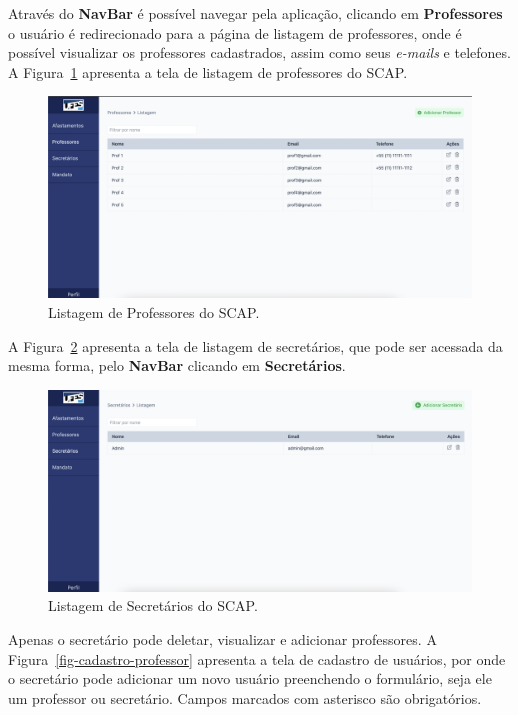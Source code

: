 Através do \textbf{NavBar} é possível navegar pela aplicação, clicando em \textbf{Professores} o usuário é redirecionado
para a página de listagem de professores, onde é possível visualizar os professores cadastrados, assim como seus \textit{e-mails}
e telefones. A Figura~\ref{fig-listagem-professores} apresenta a tela de listagem de professores do SCAP.

\begin{figure}[h!]
    \centering
    \includegraphics[width=\textwidth]{figuras/prints-app/fig-lista-professor.png}
    \caption{Listagem de Professores do SCAP.}
    \label{fig-listagem-professores}
\end{figure}

A Figura~\ref{fig-listagem-secretarios} apresenta a tela de listagem de secretários, que pode ser acessada
da mesma forma, pelo \textbf{NavBar} clicando em \textbf{Secretários}.

\begin{figure}[h!]
    \centering
    \includegraphics[width=\textwidth]{figuras/prints-app/fig-lista-secretario.png}
    \caption{Listagem de Secretários do SCAP.}
    \label{fig-listagem-secretarios}
\end{figure}

Apenas o secretário pode deletar, visualizar e adicionar professores. A Figura~\ref{fig-cadastro-professor} apresenta
a tela de cadastro de usuários, por onde o secretário pode adicionar um novo usuário preenchendo o formulário,
seja ele um professor ou secretário. Campos marcados com asterisco são obrigatórios.

